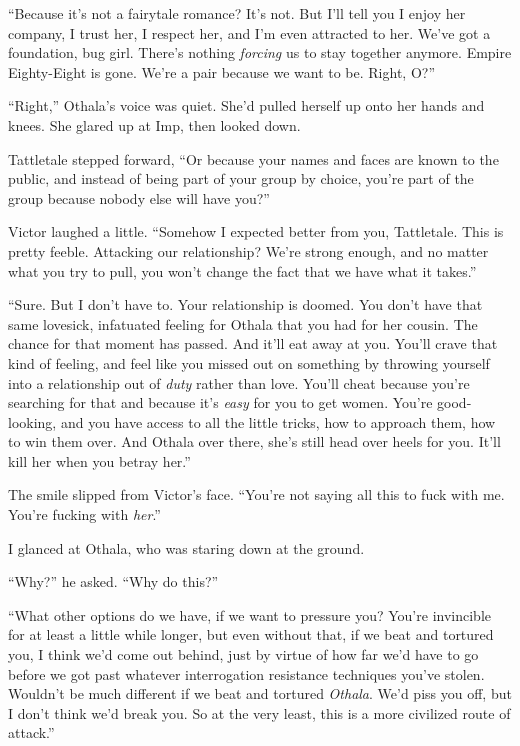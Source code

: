 ``Because it's not a fairytale romance?  It's not.  But I'll tell you I enjoy her company, I trust her, I respect her, and I'm even attracted to her.  We've got a foundation, bug girl.  There's nothing \emph{forcing} us to stay together anymore.  Empire Eighty-Eight is gone.  We're a pair because we want to be.  Right, O?''



``Right,'' Othala's voice was quiet.  She'd pulled herself up onto her hands and knees.  She glared up at Imp, then looked down.



Tattletale stepped forward, ``Or because your names and faces are known to the public, and instead of being part of your group by choice, you're part of the group because nobody else will have you?''



Victor laughed a little.  ``Somehow I expected better from you, Tattletale.  This is pretty feeble.  Attacking our relationship?  We're strong enough, and no matter what you try to pull, you won't change the fact that we have what it takes.''



``Sure.  But I don't have to.  Your relationship is doomed.  You don't have that same lovesick, infatuated feeling for Othala that you had for her cousin.  The chance for that moment has passed.  And it'll eat away at you.  You'll crave that kind of feeling, and feel like you missed out on something by throwing yourself into a relationship out of \emph{duty} rather than love.  You'll cheat because you're searching for that and because it's \emph{easy }for you to get women.  You're good-looking, and you have access to all the little tricks, how to approach them, how to win them over.  And Othala over there, she's still head over heels for you.  It'll kill her when you betray her.''



The smile slipped from Victor's face.  ``You're not saying all this to fuck with me.  You're fucking with \emph{her}.''



I glanced at Othala, who was staring down at the ground.



``Why?'' he asked.  ``Why do this?''



``What other options do we have, if we want to pressure you?  You're invincible for at least a little while longer, but even without that, if we beat and tortured you, I think we'd come out behind, just by virtue of how far we'd have to go before we got past whatever interrogation resistance techniques you've stolen.  Wouldn't be much different if we beat and tortured \emph{Othala}.  We'd piss you off, but I don't think we'd break you.  So at the very least, this is a more civilized route of attack.''



